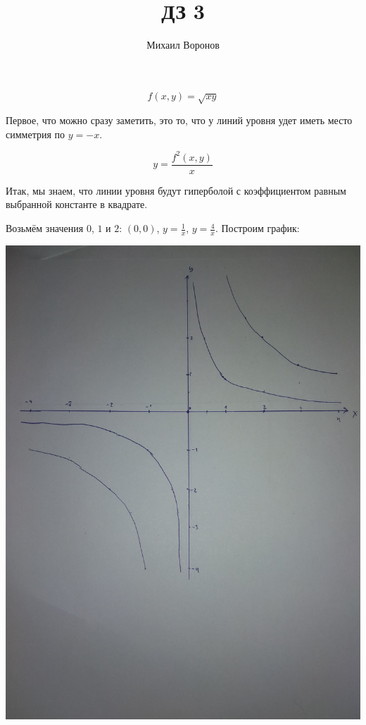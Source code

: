 \documentclass[a4paper,10pt]{article}
\title{ДЗ 3}
\author{Михаил Воронов}
\begin{document}
\maketitle

\section{}
$$ f(x, y) = \sqrt{xy} $$

Первое, что можно сразу заметить, это то, что у линий уровня удет иметь место симметрия по $ y = -x$.

$$ y = \frac{f^2(x, y)}{x} $$

Итак, мы знаем, что линии уровня будут гиперболой с коэффициентом равным выбранной константе в квадрате.

Возьмём значения $0$, $1$ и $2$: $(0, 0)$, $y = \frac{1}{x}$, 
$y = \frac{4}{x}$. Построим график:

\includegraphics[width=\textwidth]{gr.jpg}
\end{document}
